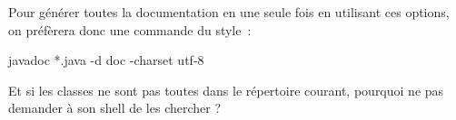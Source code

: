 Pour générer toutes la documentation en une seule fois en utilisant ces
options, on préfèrera donc une commande du style~:

\begin{term}
	javadoc *.java -d doc -charset utf-8
\end{term}

Et si les classes ne sont pas toutes dans le répertoire courant, pourquoi ne pas demander à son shell de les chercher ? 



